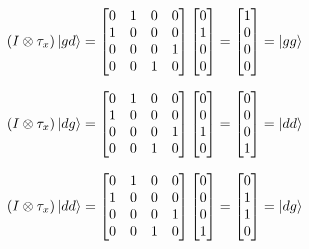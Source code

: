 \documentclass[a4paper]{article}
\begin{document}
$$
    (I \otimes \tau_{x})\ket{gd} =
    \begin{bmatrix}
        0 & 1 & 0 & 0 \\
        1 & 0 & 0 & 0 \\
        0 & 0 & 0 & 1 \\
        0 & 0 & 1 & 0
    \end{bmatrix}
    \begin{bmatrix}
        0 \\
        1 \\
        0 \\
        0
    \end{bmatrix} =
    \begin{bmatrix}
        1 \\
        0 \\
        0 \\
        0
    \end{bmatrix} =
    \ket{gg}
$$

$$
    (I \otimes \tau_{x})\ket{dg} =
    \begin{bmatrix}
        0 & 1 & 0 & 0 \\
        1 & 0 & 0 & 0 \\
        0 & 0 & 0 & 1 \\
        0 & 0 & 1 & 0
    \end{bmatrix}
    \begin{bmatrix}
        0 \\
        0 \\
        1 \\
        0
    \end{bmatrix} =
    \begin{bmatrix}
        0 \\
        0 \\
        0 \\
        1
    \end{bmatrix} =
    \ket{dd}
$$

$$
    (I \otimes \tau_{x})\ket{dd} =
    \begin{bmatrix}
        0 & 1 & 0 & 0 \\
        1 & 0 & 0 & 0 \\
        0 & 0 & 0 & 1 \\
        0 & 0 & 1 & 0
    \end{bmatrix}
    \begin{bmatrix}
        0 \\
        0 \\
        0 \\
        1
    \end{bmatrix} =
    \begin{bmatrix}
        0 \\
        1 \\
        1 \\
        0
    \end{bmatrix} =
    \ket{dg}
$$
\end{document}
